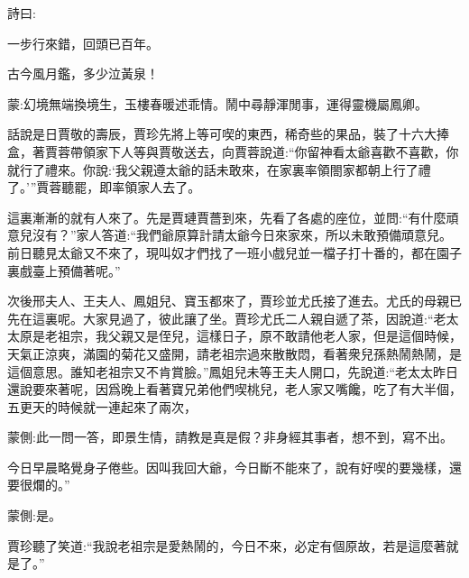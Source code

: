 
\begin{parag}
    詩曰:
\end{parag}


\begin{poem}
    \begin{pl}一步行來錯，回頭已百年。\end{pl}


    \begin{pl}古今風月鑑，多少泣黃泉！\end{pl}
\end{poem}


\begin{parag}
    \begin{note}蒙:幻境無端換境生，玉樓春暖述乖情。鬧中尋靜渾閒事，運得靈機屬鳳卿。\end{note}
\end{parag}


\begin{parag}
    話說是日賈敬的壽辰，賈珍先將上等可喫的東西，稀奇些的果品，裝了十六大捧盒，著賈蓉帶領家下人等與賈敬送去，向賈蓉說道:“你留神看太爺喜歡不喜歡，你就行了禮來。你說:‘我父親遵太爺的話未敢來，在家裏率領閤家都朝上行了禮了。’”賈蓉聽罷，即率領家人去了。
\end{parag}


\begin{parag}
    這裏漸漸的就有人來了。先是賈璉賈薔到來，先看了各處的座位，並問:“有什麼頑意兒沒有？”家人答道:“我們爺原算計請太爺今日來家來，所以未敢預備頑意兒。前日聽見太爺又不來了，現叫奴才們找了一班小戲兒並一檔子打十番的，都在園子裏戲臺上預備著呢。”
\end{parag}


\begin{parag}
    次後邢夫人、王夫人、鳳姐兒、寶玉都來了，賈珍並尤氏接了進去。尤氏的母親已先在這裏呢。大家見過了，彼此讓了坐。賈珍尤氏二人親自遞了茶，因說道:“老太太原是老祖宗，我父親又是侄兒，這樣日子，原不敢請他老人家，但是這個時候，天氣正涼爽，滿園的菊花又盛開，請老祖宗過來散散悶，看著衆兒孫熱鬧熱鬧，是這個意思。誰知老祖宗又不肯賞臉。”鳳姐兒未等王夫人開口，先說道:“老太太昨日還說要來著呢，因爲晚上看著寶兄弟他們喫桃兒，老人家又嘴饞，吃了有大半個，五更天的時候就一連起來了兩次，\begin{note}蒙側:此一問一答，即景生情，請教是真是假？非身經其事者，想不到，寫不出。\end{note}今日早晨略覺身子倦些。因叫我回大爺，今日斷不能來了，說有好喫的要幾樣，還要很爛的。”\begin{note}蒙側:是。\end{note}賈珍聽了笑道:“我說老祖宗是愛熱鬧的，今日不來，必定有個原故，若是這麼著就是了。”
\end{parag}


